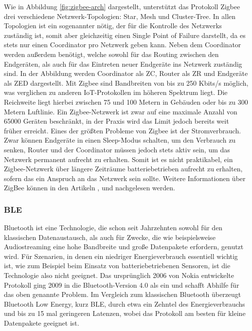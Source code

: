 Wie in Abbildung \ref{fig:zigbee-arch} dargestellt, unterstützt das Protokoll Zigbee drei verschiedene Netzwerk-Topologien: Star, Mesh und Cluster-Tree. In allen Topologien ist ein sogenannter  nötig, der für die Kontrolle des Netzwerks zuständig ist, somit aber gleichzeitig einen Single Point of Failure darstellt, da es stets nur einen Coordinator pro Netzwerk geben kann. Neben dem Coordinator werden außerdem  benötigt, welche sowohl für das Routing zwischen den Endgeräten, als auch für das Eintreten neuer Endgeräte ins Netzwerk zuständig sind. In der Abbildung werden Coordinator als ZC, Router als ZR und Endgeräte als ZED dargestellt. Mit Zigbee sind Bandbreiten von bis zu 250 Kbits/s möglich, was verglichen zu anderen IoT-Protokollen im höheren Spektrum liegt. Die Reichweite liegt hierbei zwischen 75 und 100 Metern in Gebäuden oder bis zu 300 Metern Luftlinie. Ein Zigbee-Netzwerk ist zwar auf eine maximale Anzahl von 65000 Geräten beschränkt, in der Praxis wird das Limit jedoch bereits weit früher erreicht. Eines der größten Probleme von Zigbee ist der Stromverbrauch. Zwar können Endgeräte in einen Sleep-Modus schalten, um den Verbrauch zu senken, Router und der Coordinator müssen jedoch stets aktiv sein, um das Netzwerk permanent aufrecht zu erhalten. Somit ist es nicht praktikabel, ein Zigbee-Netzwerk über längere Zeiträume batteriebetrieben aufrecht zu erhalten, sofern das ein Anspruch an das Netzwerk sein sollte. Weitere Informationen über ZigBee können in den Artikeln \cite{Rani.2019}, \cite{Salman.2019}  und \cite{ZigBeeSpecification.2015} nachgelesen werden.

\subsubsection{BLE}
\label{sec:ThHi:ble}

Bluetooth ist eine Technologie, die schon seit Jahrzehnten sowohl für den klassischen Datenaustausch, als auch für Zwecke, die wie beispielsweise Audiostreaming eine hohe Bandbreite und große Datenpakete erfordern, genutzt wird. Für Szenarien, in denen ein niedriger Energieverbrauch essentiell wichtig ist, wie zum Beispiel beim Einsatz von batteriebetriebenen Sensoren, ist die Technologie also nicht geeignet. Das ursprünglich 2006 von Nokia entwickelte Protokoll  ging 2009 in die Bluetooth-Version 4.0 als  ein und schafft Abhilfe für das oben genannte Problem. Im Vergleich zum klassischen Bluetooth überzeugt Bluetooth Low Energy, kurz BLE, durch etwa ein Zehntel des Energieverbrauchs und bis zu 15 mal geringeren Latenzen, wobei das Protokoll am besten für kleine Daten\-pakete geeignet ist. 

